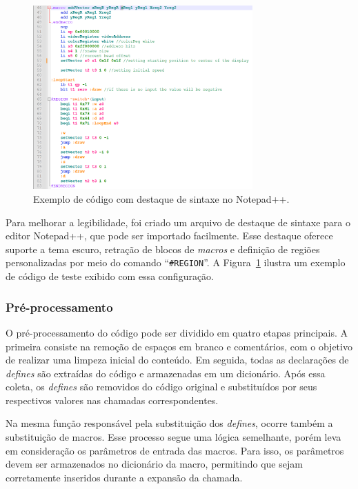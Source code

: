 \documentclass[
	12pt,				%
	openright,			%
	oneside,			%
	a4paper,			%
	english,			%
	french,				%
	spanish,			%
	brazil,				%
	]{abntex2}
\begin{document}
\begin{figure}[h]
    \centering
    \includegraphics[width=0.75\textwidth]{ProcessoDesenvolvimento/Assembler/NotepadHighlight.png}
    \caption{Exemplo de código com destaque de sintaxe no Notepad++.}
    \label{fig:NotepadHighlight}
\end{figure}

Para melhorar a legibilidade, foi criado um arquivo de destaque de sintaxe para o editor Notepad++, que pode ser importado facilmente. Esse destaque oferece suporte a tema escuro, retração de blocos de \textit{macros} e definição de regiões personalizadas por meio do comando ``\texttt{\#REGION}''. A Figura~\ref{fig:NotepadHighlight} ilustra um exemplo de código de teste exibido com essa configuração.

\subsubsection{Pré-processamento}

O pré-processamento do código pode ser dividido em quatro etapas principais. A primeira consiste na remoção de espaços em branco e comentários, com o objetivo de realizar uma limpeza inicial do conteúdo. Em seguida, todas as declarações de \textit{defines} são extraídas do código e armazenadas em um dicionário. Após essa coleta, os \textit{defines} são removidos do código original e substituídos por seus respectivos valores nas chamadas correspondentes.

Na mesma função responsável pela substituição dos \textit{defines}, ocorre também a substituição de macros. Esse processo segue uma lógica semelhante, porém leva em consideração os parâmetros de entrada das macros. Para isso, os parâmetros devem ser armazenados no dicionário da macro, permitindo que sejam corretamente inseridos durante a expansão da chamada.
\end{document}
